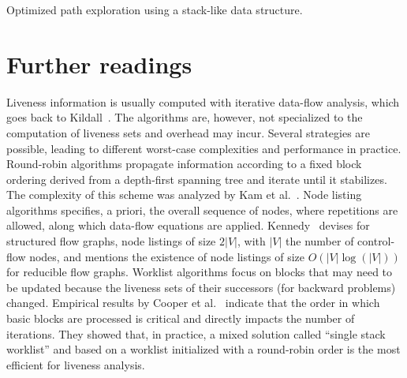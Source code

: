 \begin{algorithm}[h]
  \caption{Optimized path exploration using a stack-like data structure.}
  \label{alg:up_and_mark_stack}
\end{algorithm}




\section{Further readings}
\label{sec:liveness:further}
Liveness information is usually computed with iterative
data-flow analysis, which goes back to Kildall~\cite{Kildall}. The algorithms are,
however, not specialized to the computation of liveness sets and overhead may
incur. Several strategies are possible, leading to
different worst-case complexities and performance in practice. Round-robin algorithms
propagate information according to a fixed block ordering derived from a
depth-first spanning tree and iterate until it stabilizes.  The complexity of
this scheme was analyzed by Kam et al.~\cite{novillo:bib:KU76}.  
Node listing algorithms specifies, a priori, the overall sequence of nodes, where repetitions are allowed, along which data-flow equations are applied.
Kennedy~\cite{Kennedy75} devises for structured flow graphs, node listings of size $2|V|$, with $|V|$ the number of control-flow nodes, and mentions the existence of node listings of size $O\left(|V| \log(|V|)\right)$ for reducible flow graphs.
Worklist algorithms focus on blocks that may need
to be updated because the liveness sets of their successors (for
backward problems) changed.
Empirical results by Cooper et al.~\cite{CHK06} indicate that the order in
which basic blocks are processed is critical and directly impacts the number of
iterations. They showed that, in practice, a mixed solution called ``single
stack worklist'' and based on a worklist initialized with a round-robin order is
the most efficient for liveness analysis. 

